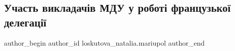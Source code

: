  
 
 
 
 

\subsection{Участь викладачів МДУ у роботі французької делегації}
\label{sec:11_02_2022.fb.loskutova_natalia.mariupol.1.uchast_vikladach_v_m}

\ifcmt
 author_begin
   author_id loskutova_natalia.mariupol
 author_end
\fi

